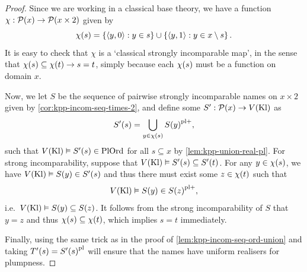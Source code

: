 \documentclass[12pt,openany]{book}
\theoremstyle{plain}
\theoremstyle{definition}
\newcommand\tuple[1]{\left\langle #1 \right\rangle}
\newcommand\Pow{\mathcal{P}}
\newcommand\PlOrd{\mathrm{PlOrd}}
\newcommand\Kl{\mathrm{Kl}}
\newcommand\pl{\mathrm{pl}}
\newcommand\pls{{\pl +}}
\begin{document}
\begin{proof}
  Since we are working in a classical base theory, we have a function $\chi : \Pow\mleft(x\mright) \rightarrow \Pow\mleft(x \times 2\mright)$ given by
  \[\chi\mleft(s\mright) = \left\{\tuple{y, 0} : y \in s\right\} \cup \left\{\tuple{y, 1} : y \in x \setminus s\right\}.\]
  It is easy to check that $\chi$ is a `classical strongly incomparable map', in the sense that $\chi\mleft(s\mright) \subseteq \chi\mleft(t\mright) \rightarrow s = t$, simply because each $\chi\mleft(s\mright)$ must be a function on domain $x$.

  Now, we let $S$ be the sequence of pairwise strongly incomparable names on $x \times 2$ given by \autoref{cor:kpp-incom-seq-times-2}, and define some $S' : \Pow\mleft(x\mright) \rightarrow V\mleft(\Kl\mright)$ as
  \[S'\mleft(s\mright) = \bigcup_{y \in \chi\mleft(s\mright)} S\mleft(y\mright)^\pls,\]
  such that $V\mleft(\Kl\mright) \vDash S'\mleft(s\mright) \in \PlOrd$ for all $s \subseteq x$ by \autoref{lem:kpp-union-real-pl}. For strong incomparability, suppose that $V\mleft(\Kl\mright) \vDash S'\mleft(s\mright) \subseteq S'\mleft(t\mright)$. For any $y \in \chi\mleft(s\mright)$, we have $V\mleft(\Kl\mright) \vDash S\mleft(y\mright) \in S'\mleft(s\mright)$ and thus there must exist some $z \in \chi\mleft(t\mright)$ such that
  \[V\mleft(\Kl\mright) \vDash S\mleft(y\mright) \in S\mleft(z\mright)^\pls,\]
  i.e.\ $V\mleft(\Kl\mright) \vDash S\mleft(y\mright) \subseteq S\mleft(z\mright)$. It follows from the strong incomparability of $S$ that $y = z$ and thus $\chi\mleft(s\mright) \subseteq \chi\mleft(t\mright)$, which implies $s = t$ immediately.

  Finally, using the same trick as in the proof of \autoref{lem:kpp-incom-seq-ord-union} and taking $T'\mleft(s\mright) = S'\mleft(s\mright)^\pl$ will ensure that the names have uniform realisers for plumpness.
\end{proof}
\end{document}
